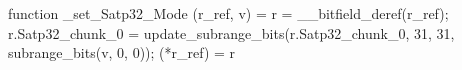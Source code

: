 function _set_Satp32_Mode (r_ref, v) = {
    r = __bitfield_deref(r_ref);
    r.Satp32_chunk_0 = update_subrange_bits(r.Satp32_chunk_0, 31, 31, subrange_bits(v, 0, 0));
    (*r_ref) = r
}
